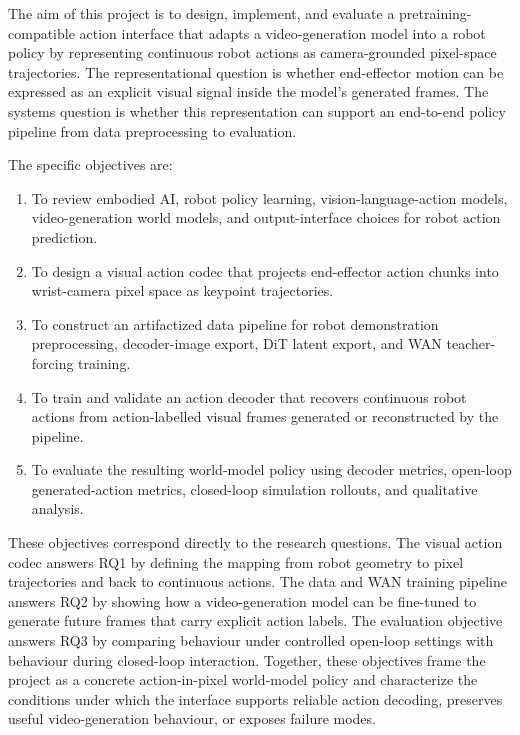 The aim of this project is to design, implement, and evaluate a pretraining-compatible action interface that adapts a video-generation model into a robot policy by representing continuous robot actions as camera-grounded pixel-space trajectories. The representational question is whether end-effector motion can be expressed as an explicit visual signal inside the model's generated frames. The systems question is whether this representation can support an end-to-end policy pipeline from data preprocessing to evaluation.

The specific objectives are:

\begin{enumerate}
  \item To review embodied AI, robot policy learning, vision-language-action models, video-generation world models, and output-interface choices for robot action prediction.
  \item To design a visual action codec that projects end-effector action chunks into wrist-camera pixel space as keypoint trajectories.
  \item To construct an artifactized data pipeline for robot demonstration preprocessing, decoder-image export, DiT latent export, and WAN teacher-forcing training.
  \item To train and validate an action decoder that recovers continuous robot actions from action-labelled visual frames generated or reconstructed by the pipeline.
  \item To evaluate the resulting world-model policy using decoder metrics, open-loop generated-action metrics, closed-loop simulation rollouts, and qualitative analysis.
\end{enumerate}

These objectives correspond directly to the research questions. The visual action codec answers RQ1 by defining the mapping from robot geometry to pixel trajectories and back to continuous actions. The data and WAN training pipeline answers RQ2 by showing how a video-generation model can be fine-tuned to generate future frames that carry explicit action labels. The evaluation objective answers RQ3 by comparing behaviour under controlled open-loop settings with behaviour during closed-loop interaction. Together, these objectives frame the project as a concrete action-in-pixel world-model policy and characterize the conditions under which the interface supports reliable action decoding, preserves useful video-generation behaviour, or exposes failure modes.


